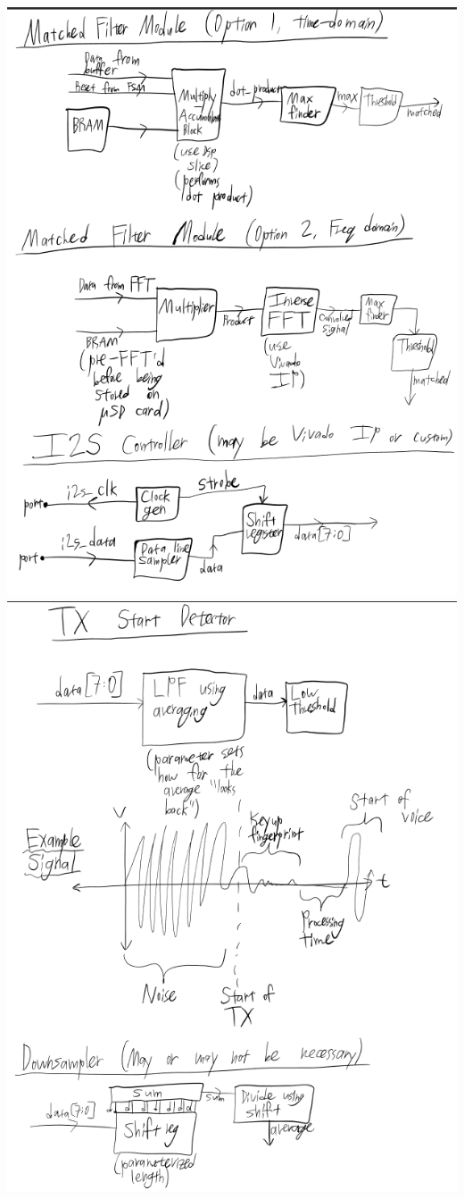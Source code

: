 \documentclass{article}
\begin{document}
\includegraphics[width=6.5in]{Modules_1.png}
\newpage
\includegraphics[width=6.5in]{Modules_2.png}
\end{document}
